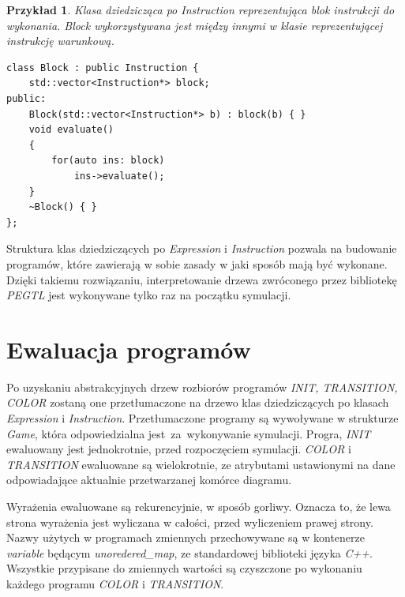 \documentclass[declaration,shortabstract, inz]{iithesis}
\theoremstyle{definition} \newtheorem{definition}{Definicja}[]
\theoremstyle{plain} \newtheorem{remark}[definition]{Obserwacja}
\theoremstyle{plain} \newtheorem{theorem}[definition]{Twierdzenie}
\theoremstyle{plain} \newtheorem{example}{Przykład}[definition]
\theoremstyle{plain} \newtheorem{lemma}[definition]{Lemat}
\begin{document}
\begin{example}
Klasa dziedzicząca po \textit{Instruction} reprezentująca blok instrukcji do wykonania. \textit{Block} wykorzystywana jest między innymi w klasie reprezentującej instrukcję warunkową.
\begin{center}
\begin{lstlisting}
class Block : public Instruction {
    std::vector<Instruction*> block;
public:
    Block(std::vector<Instruction*> b) : block(b) { }
    void evaluate()
    {
        for(auto ins: block)
            ins->evaluate();
    }
    ~Block() { }
};
\end{lstlisting}
\end{center}
\end{example}

Struktura klas dziedziczących po \textit{Expression} i \textit{Instruction} pozwala na budowanie programów, które zawierają w sobie zasady w jaki sposób mają być wykonane. Dzięki takiemu rozwiązaniu, interpretowanie drzewa zwróconego przez bibliotekę \textit{PEGTL} jest wykonywane tylko raz na początku symulacji. 

\section{Ewaluacja programów}
Po uzyskaniu abstrakcyjnych drzew rozbiorów programów \textit{INIT, TRANSITION, COLOR} zostaną one przetłumaczone na drzewo klas dziedziczących po klasach \textit{Expression} i \textit{Instruction}. Przetłumaczone programy są wywoływane w strukturze \textit{Game}, która odpowiedzialna jest~za~wykonywanie symulacji. Progra, \textit{INIT} ewaluowany jest jednokrotnie, przed rozpoczęciem symulacji. \textit{COLOR} i \textit{TRANSITION} ewaluowane są wielokrotnie, ze atrybutami ustawionymi na dane odpowiadające aktualnie przetwarzanej komórce diagramu. 

Wyrażenia ewaluowane są rekurencyjnie, w sposób gorliwy. Oznacza to, że lewa strona wyrażenia jest wyliczana w całości, przed wyliczeniem prawej strony. Nazwy użytych w programach zmiennych przechowywane są w kontenerze \textit{variable} będącym \textit{unoredered\_map}, ze standardowej biblioteki języka \textit{C++}. Wszystkie przypisane do zmiennych wartości są czyszczone po wykonaniu każdego programu \textit{COLOR} i \textit{TRANSITION}.
\end{document}

